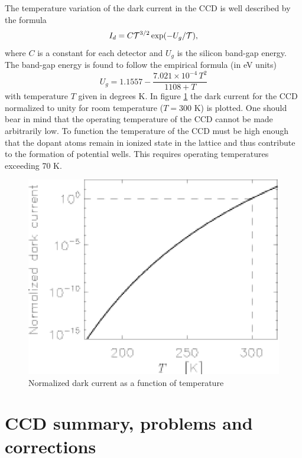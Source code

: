 The temperature variation of the dark current in the CCD is well
described by the formula
\begin{equation}
  I_d = C {\cal T}^{3/2} \exp(-U_g/{\cal T}),
\end{equation}
where $C$ is a constant for each detector and $U_g$ is the silicon
band-gap energy. The band-gap energy is found to follow the empirical
formula (in eV units)
\begin{equation}
  U_g = 1.1557 - \frac{7.021\times 10^{-4}\, T^2}{1108+T}
\end{equation} 
with temperature $T$ given in degrees K. In figure \ref{CCD.figdark}
the dark current for the CCD normalized to unity for room temperature
($T = 300$ K) is plotted.  One should bear in mind that the operating
temperature of the CCD cannot be made arbitrarily low. To function the
temperature of the CCD must be high enough that the dopant atoms
remain in ionized state in the lattice and thus contribute to the
formation of potential wells. This requires operating temperatures
exceeding 70 K.

\begin{figure}[h]
  \centering
	\includegraphics{CCD_dark.eps}
  \caption{Normalized dark current as a function of temperature }
  \label{CCD.figdark}
\end{figure}

\section{CCD summary, problems and corrections}

